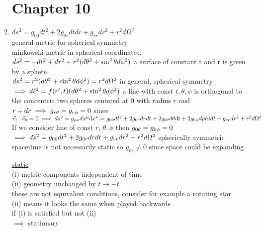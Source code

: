 \documentclass[12pt]{amsart}
\begin{document}
\begin{enumerate}
\section*{Chapter 10}
\item \underline{$ds^2 = g_{00} dt^2 + 2 g_{0r} dt dr + g_{rr} dr^2 + r^2 d \Omega^2$}\\
general metric for spherical symmetry\\
minkowski metric in spherical coordinates:\\
$ds^2 = - dt^2 + dr^2 + r^2 (d \theta^2 + \sin^2 \theta d \phi^2)\\$
a surface of constant t and r is given by a sphere\\
$ds^2 = r^2(d \theta^2 + \sin^2 \theta d \phi^2) = r^2 d \Omega^2\\$
in general, spherical symmetry\\
$\implies d \ell^2 = f(r',t) (d \theta^2 + \sin^2 \theta d \phi^2)\\$
a line with const $t, \theta, \phi$ is orthogonal to the concentric two spheres centered at 0 with radius $r$ and $r + dr \implies g_{r \theta} = g_{r \phi} = 0\\$
since $\vec{e}_r \cdot \vec{e}_{\theta} = 0\\
\implies ds^2 = g_{\mu \nu} dx^{\mu} dx^{\nu} = g_{00} dt^2 + 2 g_{0r} dr dt + 2 g_{0 \theta} d \theta dt + 2 g_{0 \phi} d \\phi dt + g_{rr} dr^2 + r^2 d \Omega^2\\$
If we consider line of const $r$, $\theta, \phi$ then $g_{0 \theta} = g_{0 \phi} =0\\$
$\implies ds^2 = g_{00} dt^2 + 2 g_{0r} dr dt + g_{rr} dr^2 + r^2 d \Omega^2\\$
spherically symmetric spacetime is not necessarily static so $g_{0r} \neq 0$ since space could be expanding\\


\hdashrule[0.5ex][c]{\linewidth}{0.5pt}{1.5mm}


\underline{static}\\
(i) metric components independent of time\\
(ii) geometry unchanged by $t \rightarrow -t$\\
these are not equivalent conditions, consider for example a rotating star\\
(ii) means it looks the same when played backwards\\
if (i) is satisfied but not (ii)\\
$\implies$ stationary\\



\end{enumerate}
\end{document}
